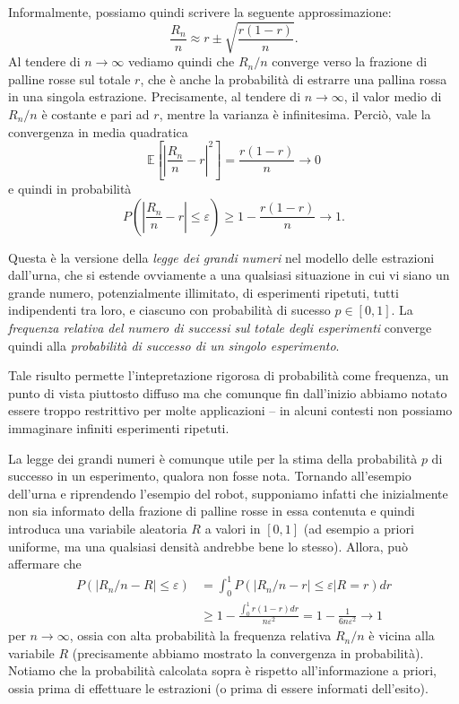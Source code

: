 \documentclass[
  italian,
  letterpaper,
]{book}
\newcommand{\bra}[1]{\left( #1 \right)}
\newcommand{\sqa}[1]{\left[ #1 \right]}
\newcommand{\abs}[1]{\left| #1 \right|}
\newcommand{\E}[1]{\mathbb{E}\sqa{#1}}
\theoremstyle{definition}
\theoremstyle{remark}
\begin{document}
Informalmente, possiamo quindi scrivere la seguente approssimazione:
\[ \frac{R_n}{n} \approx r \pm \sqrt{ \frac{ r(1-r)}{n}}.\] Al tendere
di \(n \to \infty\) vediamo quindi che \(R_n/n\) converge verso la
frazione di palline rosse sul totale \(r\), che è anche la probabilità
di estrarre una pallina rossa in una singola estrazione. Precisamente,
al tendere di \(n \to \infty\), il valor medio di \(R_n/n\) è costante e
pari ad \(r\), mentre la varianza è infinitesima. Perciò, vale la
convergenza in media quadratica
\[ \E{ \abs{ \frac{R_n}{n} - r}^2   } = \frac{ r(1-r)}{n} \to 0 \] e
quindi in probabilità
\[ P\bra{ \abs{ \frac{R_n}{n} - r} \le \varepsilon} \ge 1- \frac{ r(1-r)}{n} \to 1 .\]

Questa è la versione della \emph{legge dei grandi numeri} nel modello
delle estrazioni dall'urna, che si estende ovviamente a una qualsiasi
situazione in cui vi siano un grande numero, potenzialmente illimitato,
di esperimenti ripetuti, tutti indipendenti tra loro, e ciascuno con
probabilità di sucesso \(p \in [0,1]\). La \emph{frequenza relativa del
numero di successi sul totale degli esperimenti} converge quindi alla
\emph{probabilità di successo di un singolo esperimento}.

Tale risulto permette l'intepretazione rigorosa di probabilità come
frequenza, un punto di vista piuttosto diffuso ma che comunque fin
dall'inizio abbiamo notato essere troppo restrittivo per molte
applicazioni -- in alcuni contesti non possiamo immaginare infiniti
esperimenti ripetuti.

La legge dei grandi numeri è comunque utile per la stima della
probabilità \(p\) di successo in un esperimento, qualora non fosse nota.
Tornando all'esempio dell'urna e riprendendo l'esempio del robot,
supponiamo infatti che inizialmente non sia informato della frazione di
palline rosse in essa contenuta e quindi introduca una variabile
aleatoria \(R\) a valori in \([0,1]\) (ad esempio a priori uniforme, ma
una qualsiasi densità andrebbe bene lo stesso). Allora, può affermare
che
\[ \begin{split} P( |R_n/n - R| \le \varepsilon ) & = \int_0^1 P( |R_n/n - r| \le \varepsilon |R = r) dr \\
&  \ge 1- \frac{\int_0^1 r(1-r) dr }{n\varepsilon^2} = 1-  \frac{1}{6n \varepsilon^2}  \to 1
\end{split}\] per \(n \to \infty\), ossia con alta probabilità la
frequenza relativa \(R_n/n\) è vicina alla variabile \(R\) (precisamente
abbiamo mostrato la convergenza in probabilità). Notiamo che la
probabilità calcolata sopra è rispetto all'informazione a priori, ossia
prima di effettuare le estrazioni (o prima di essere informati
dell'esito).
\end{document}
